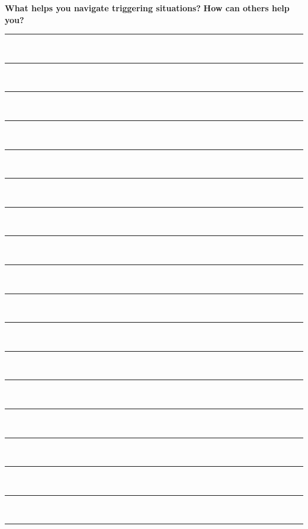 \noindent\textcolor{ProcessBlue}{\textbf{\Large{What helps you navigate triggering situations?}}}
\noindent\textcolor{ProcessBlue}{\textbf{\Large{How can others help you?}}}\\
\noindent\rule{\textwidth}{1pt}\\
\noindent\rule{\textwidth}{1pt}\\
\noindent\rule{\textwidth}{1pt}\\
\noindent\rule{\textwidth}{1pt}\\
\noindent\rule{\textwidth}{1pt}\\
\noindent\rule{\textwidth}{1pt}\\
\noindent\rule{\textwidth}{1pt}\\
\noindent\rule{\textwidth}{1pt}\\
\noindent\rule{\textwidth}{1pt}\\
\noindent\rule{\textwidth}{1pt}\\
\noindent\rule{\textwidth}{1pt}\\
\noindent\rule{\textwidth}{1pt}\\
\noindent\rule{\textwidth}{1pt}\\
\noindent\rule{\textwidth}{1pt}\\
\noindent\rule{\textwidth}{1pt}\\
\noindent\rule{\textwidth}{1pt}\\
\noindent\rule{\textwidth}{1pt}\\
\noindent\rule{\textwidth}{1pt}\\\
\newpage

